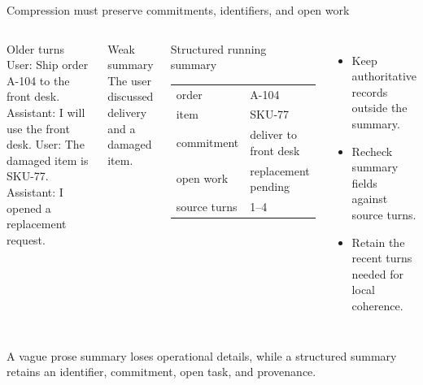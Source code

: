 \documentclass[aspectratio=169]{beamer}
\newcommand{\visualdescription}[1]{\par\vspace{.2em}\noindent\parbox{\linewidth}{\centering\tiny\color{hrgray}#1}}
\begin{document}
\begin{frame}{Compression must preserve commitments, identifiers, and open work}
\small
\begin{columns}[T]
\begin{block}{Older turns}
User: Ship order A-104 to the front desk.\newline
Assistant: I will use the front desk.\newline
User: The damaged item is SKU-77.\newline
Assistant: I opened a replacement request.
\end{block}
\begin{alertblock}{Weak summary}
The user discussed delivery and a damaged item.
\end{alertblock}
\begin{block}{Structured running summary}
\begin{tabular}{@{}ll@{}}
order & A-104 \\
item & SKU-77 \\
commitment & deliver to front desk \\
open work & replacement pending \\
source turns & 1--4 \\
\end{tabular}
\end{block}
\begin{itemize}\itemsep2pt
  \item Keep authoritative records outside the summary.
  \item Recheck summary fields against source turns.
  \item Retain the recent turns needed for local coherence.
\end{itemize}
\end{columns}
\vspace{.5em}
\visualdescription{A vague prose summary loses operational details, while a structured summary retains an identifier, commitment, open task, and provenance.}
\end{frame}
\end{document}
